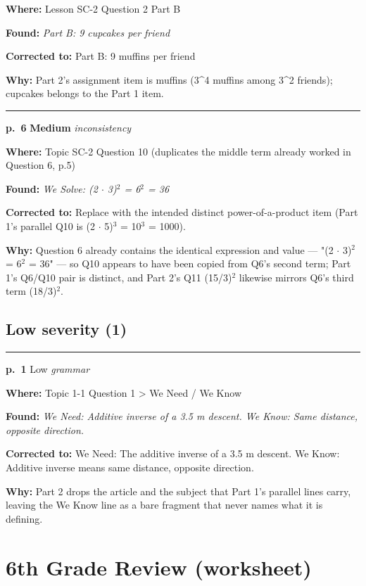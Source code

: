 \documentclass[11pt]{article}
\newcommand{\sevmed}[1]{\textcolor{orange!80!black}{\textbf{#1}}}
\newcommand{\sevlow}[1]{\textcolor{black!55}{#1}}
\begin{document}
\noindent\textbf{Where: }Lesson SC-2 Question 2 Part B\par
\noindent\textbf{Found: }\textit{Part B: 9 cupcakes per friend}\par
\noindent\textbf{Corrected to: }Part B: 9 muffins per friend\par
\noindent\textbf{Why: }Part 2's assignment item is muffins (3\textasciicircum{}4 muffins among 3\textasciicircum{}2 friends); cupcakes belongs to the Part 1 item.\par\vspace{4pt}
\noindent\rule{\textwidth}{0.4pt}\par\nobreak\vspace{2pt}
\noindent\textbf{p.~6} \quad \sevmed{Medium} \quad \textit{inconsistency}\par
\noindent\textbf{Where: }Topic SC-2 Question 10 (duplicates the middle term already worked in Question 6, p.5)\par
\noindent\textbf{Found: }\textit{We Solve: (2 $\cdot$ 3)$^2$ = 6$^2$ = 36}\par
\noindent\textbf{Corrected to: }Replace with the intended distinct power-of-a-product item (Part 1's parallel Q10 is (2 $\cdot$ 5)$^3$ = 10$^3$ = 1000).\par
\noindent\textbf{Why: }Question 6 already contains the identical expression and value --- "(2 $\cdot$ 3)$^2$ = 6$^2$ = 36" --- so Q10 appears to have been copied from Q6's second term; Part 1's Q6/Q10 pair is distinct, and Part 2's Q11 (15/3)$^2$ likewise mirrors Q6's third term (18/3)$^2$.\par\vspace{4pt}
\subsection*{Low severity (1)}
\noindent\rule{\textwidth}{0.4pt}\par\nobreak\vspace{2pt}
\noindent\textbf{p.~1} \quad \sevlow{Low} \quad \textit{grammar}\par
\noindent\textbf{Where: }Topic 1-1 Question 1 > We Need / We Know\par
\noindent\textbf{Found: }\textit{We Need: Additive inverse of a 3.5 m descent. We Know: Same distance, opposite direction.}\par
\noindent\textbf{Corrected to: }We Need: The additive inverse of a 3.5 m descent. We Know: Additive inverse means same distance, opposite direction.\par
\noindent\textbf{Why: }Part 2 drops the article and the subject that Part 1's parallel lines carry, leaving the We Know line as a bare fragment that never names what it is defining.\par\vspace{4pt}
\newpage\section*{6th Grade Review (worksheet)}
\end{document}
